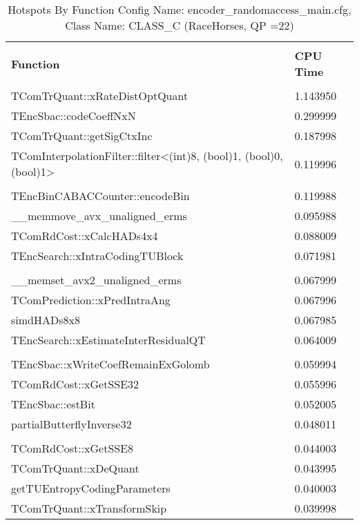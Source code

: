 \documentclass{article}%
\begin{document}
\begin{longtabu}{| X[l] | X[l] |}%
\caption{%
Hotspots By Function\newline%
 Config Name: encoder\_randomaccess\_main.cfg,\newline%
 Class Name: CLASS\_C\newline%
 (RaceHorses, QP =22)%
}%
\hline%
&\\%
\textbf{Function}&\textbf{CPU Time}\\%
&\\%
\hline%
\endhead%
TComTrQuant::xRateDistOptQuant&1.143950\\%
\hline%
TEncSbac::codeCoeffNxN&0.299999\\%
\hline%
TComTrQuant::getSigCtxInc&0.187998\\%
\hline%
TComInterpolationFilter::filter<(int)8, (bool)1, (bool)0, (bool)1>&0.119996\\%
\hline%
&\\%
\hline%
TEncBinCABACCounter::encodeBin&0.119988\\%
\hline%
\_\_memmove\_avx\_unaligned\_erms&0.095988\\%
\hline%
TComRdCost::xCalcHADs4x4&0.088009\\%
\hline%
TEncSearch::xIntraCodingTUBlock&0.071981\\%
\hline%
&\\%
\hline%
\_\_memset\_avx2\_unaligned\_erms&0.067999\\%
\hline%
TComPrediction::xPredIntraAng&0.067996\\%
\hline%
simdHADs8x8&0.067985\\%
\hline%
TEncSearch::xEstimateInterResidualQT&0.064009\\%
\hline%
&\\%
\hline%
TEncSbac::xWriteCoefRemainExGolomb&0.059994\\%
\hline%
TComRdCost::xGetSSE32&0.055996\\%
\hline%
TEncSbac::estBit&0.052005\\%
\hline%
partialButterflyInverse32&0.048011\\%
\hline%
&\\%
\hline%
TComRdCost::xGetSSE8&0.044003\\%
\hline%
TComTrQuant::xDeQuant&0.043995\\%
\hline%
getTUEntropyCodingParameters&0.040003\\%
\hline%
TComTrQuant::xTransformSkip&0.039998\\%
\hline%
\end{longtabu}%
\newpage%
\end{document}
